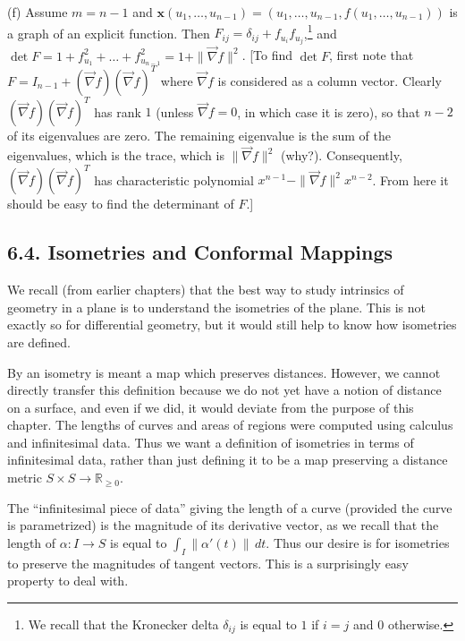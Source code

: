 \documentclass[leqno]{book}
\begin{document}
\begin{enumerate}
(f) Assume $m=n-1$ and $\mathbf x(u_1,\dots,u_{n-1})=(u_1,\dots,u_{n-1},f(u_1,\dots,u_{n-1}))$ is a graph of an explicit function.  Then $F_{ij}=\delta_{ij}+f_{u_i}f_{u_j}$,\footnote{We recall that the Kronecker delta $\delta_{ij}$ is equal to $1$ if $i=j$ and $0$ otherwise.} and $\det F=1+f_{u_1}^2+\dots+f_{u_{n-1}}^2=1+\|\vec\nabla f\|^2$.  [To find $\det F$, first note that $F=I_{n-1}+(\vec\nabla f)(\vec\nabla f)^T$ where $\vec\nabla f$ is considered as a column vector.  Clearly $(\vec\nabla f)(\vec\nabla f)^T$ has rank $1$ (unless $\vec\nabla f=0$, in which case it is zero), so that $n-2$ of its eigenvalues are zero.  The remaining eigenvalue is the sum of the eigenvalues, which is the trace, which is $\|\vec\nabla f\|^2$ (why?).  Consequently, $(\vec\nabla f)(\vec\nabla f)^T$ has characteristic polynomial $x^{n-1}-\|\vec\nabla f\|^2x^{n-2}$.  From here it should be easy to find the determinant of $F$.]
\end{enumerate}

\subsection*{6.4. Isometries and Conformal Mappings}
We recall (from earlier chapters) that the best way to study intrinsics of geometry in a plane is to understand the isometries of the plane.  This is not exactly so for differential geometry, but it would still help to know how isometries are defined.

By an isometry is meant a map which preserves distances.  However, we cannot directly transfer this definition because we do not yet have a notion of distance on a surface, and even if we did, it would deviate from the purpose of this chapter.  The lengths of curves and areas of regions were computed using calculus and infinitesimal data.  Thus we want a definition of isometries in terms of infinitesimal data, rather than just defining it to be a map preserving a distance metric $S\times S\to\mathbb R_{\geqslant 0}$. %

The ``infinitesimal piece of data'' giving the length of a curve (provided the curve is parametrized) is the magnitude of its derivative vector, as we recall that the length of $\alpha:I\to S$ is equal to $\int_I\|\alpha'(t)\|\,dt$.  Thus our desire is for isometries to preserve the magnitudes of tangent vectors.  This is a surprisingly easy property to deal with.\\
\end{document}

